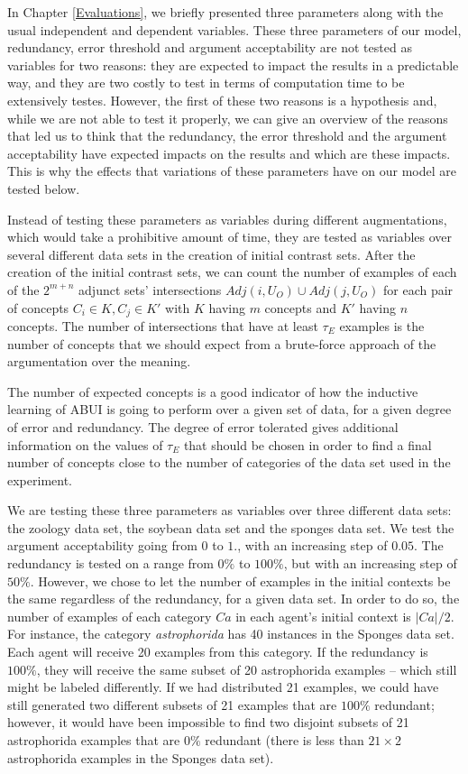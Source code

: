 In Chapter \ref{Evaluations}, we briefly presented three parameters along with the usual independent and dependent variables. These three parameters of our model, redundancy, error threshold and argument acceptability are not tested as variables for two reasons: they are expected to impact the results in a predictable way, and they are two costly to test in terms of computation time to be extensively testes. However, the first of these two reasons is a hypothesis and, while we are not able to test it properly, we can give an overview of the reasons that led us to think that the redundancy, the error threshold and the argument acceptability have expected impacts on the results and which are these impacts. This is why the effects that variations of these parameters have on our model are tested below.

Instead of testing these parameters as variables during different augmentations, which would take a prohibitive amount of time, they are tested as variables over several different data sets in the creation of initial contrast sets. After the creation of the initial contrast sets, we can count the number of examples of each of the $2^{m+n}$ adjunct sets' intersections $Adj(i,U_{O}) \cup Adj(j,U_{O})$ for each pair of concepts $C_{i} \in K, C_{j} \in K'$ with $K$ having $m$ concepts and $K'$ having $n$ concepts. The number of intersections that have at least $\tau_{E}$ examples is the number of concepts that we should expect from a brute-force approach of the argumentation over the meaning.

The number of expected concepts is a good indicator of how the inductive learning of ABUI is going to perform over a given set of data, for a given degree of error and redundancy. The degree of error tolerated gives additional information on the values of $\tau_{E}$ that should be chosen in order to find a final number of concepts close to the number of categories of the data set used in the experiment.

We are testing these three parameters as variables over three different data sets: the zoology data set, the soybean data set and the sponges data set. We test the argument acceptability going from $0$ to $1.$, with an increasing step of $0.05$. The redundancy is tested on a range from $0 \%$ to $100 \%$, but with an increasing step of $50 \%$. However, we chose to let the number of examples in the initial contexts be the same regardless of the redundancy, for a given data set. In order to do so, the number of examples of each category $Ca$ in each agent's initial context is $|Ca|/2$. For instance, the category \emph{astrophorida} has 40 instances in the Sponges data set. Each agent will receive 20 examples from this category. If the redundancy is $100 \%$, they will receive the same subset of 20 astrophorida examples -- which still might be labeled differently. If we had distributed 21 examples, we could have still generated two different subsets of 21 examples that are $100 \%$ redundant; however, it would have been impossible to find two disjoint subsets of 21 astrophorida examples that are $0 \%$ redundant (there is less than $21 \times 2$ astrophorida examples in the Sponges data set).

